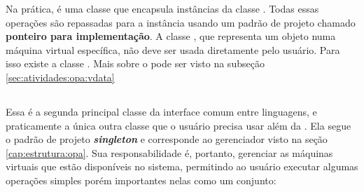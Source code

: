   Na prática, \VObj{} é uma classe que encapsula instâncias da classe \VData{}. Todas essas
  operações são repassadas para a instância \VData{} usando um padrão de projeto chamado
  \textbf{ponteiro para implementação}\footnotemark{}. A classe \VData{}, que representa um objeto numa máquina
  virtual específica, não deve ser usada diretamente pelo usuário. Para isso existe a classe
  \VObj{}. Mais sobre o \VData{} pode ser visto na subseção \ref{sec:atividades:opa:vdata}
  
  
  \subsection{\SMgr{}}
  \label{sec:atividades:opa:smgr}
  Essa é a segunda principal classe da interface comum entre linguagens, e praticamente a
  única outra classe que o usuário precisa usar além da \VObj{}. Ela segue o padrão de projeto
  \textbf{\textit{singleton}}\footnotemark{} e corresponde ao gerenciador visto na seção
  \ref{cap:estrutura:opa}. Sua responsabilidade é, portanto, gerenciar as máquinas virtuais
  que estão disponíveis no sistema, permitindo ao usuário executar algumas operações simples
  porém importantes nelas como um conjunto:

  
